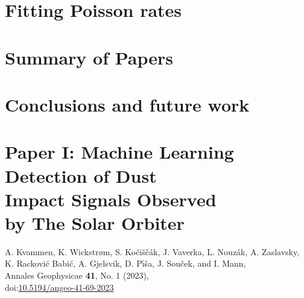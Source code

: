 \documentclass[11pt,twoside,openright]{book}
\begin{document}
\chapter{Fitting Poisson rates}


\chapter{Summary of Papers}\label{ch:sum-paper}




\chapter{Conclusions and future work}\label{ch:conclusion}





\backmatter


%
\printbibliography[heading=bibintoc,title={Bibliography}]




\chapter{Paper I: Machine Learning \\ Detection of Dust \\ Impact Signals Observed \\ by The Solar Orbiter}
A. Kvammen, K. Wickstr{\o}m, S. Ko{\v{c}}i{\v{s}}{\v{c}}{\'a}k, J. Vaverka, L. Nouz{\'a}k, A. Zaslavsky, K. Rackovi{\'c} Babi{\'c}, A. Gjelsvik, D. P{\'\i}{\v{s}}a, J. Sou{\v{c}}ek, and I. Mann, \\
Annales Geophysicae {\bf 41}, No. 1 (2023),\\
doi:\href{https://doi.org/10.5194/angeo-41-69-2023}{10.5194/angeo-41-69-2023}
\newpage\null\newpage

\end{document}
